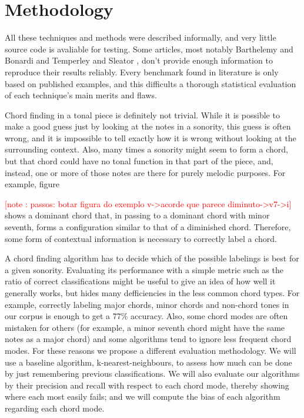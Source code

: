 \documentclass{article}
\newcounter{notecounter}
\newcommand{\note}[1]{
  \addtocounter{notecounter}{1}
  \textcolor{red}{[note \arabic{notecounter}: #1]}
}
\newcommand{\comment}[1]{}
\begin{document}
\section{Methodology}
\label{sec:methodology}

\comment{
  ==> um problema de information retrieval
  ==> precision, recall (e significado)
  ==> corais de bach
}

All these techniques and methods were described informally, and very
little source code is avaliable for testing. Some articles, most
notably Barthelemy and Bonardi \cite{barthelemy.ea:figured} and
Temperley and Sleator \cite{temperley.ea:modeling}, don't provide
enough information to reproduce their results reliably. Every
benchmark found in literature \cite{pardo.ea:automated,
  barthelemy.ea:figured, tsui:harmonic, taube:automatic,
  illescas.ea:harmonic} is only based on published examples, and this
difficults a thorough statistical evaluation of each technique's main
merits and flaws.

Chord finding in a tonal piece is definitely not trivial. While it is
possible to make a good guess just by looking at the notes in a
sonority, this guess is often wrong, and it is impossible to tell
exactly how it is wrong without looking at the surrounding
context. Also, many times a sonority might seem to form a chord, but
that chord could have no tonal function in that part of the piece,
and, instead, one or more of those notes are there for purely melodic
purposes. For example, figure \note{passos: botar figura do exemplo
  v->acorde que parece diminuto->v7->i} shows a dominant chord that,
in passing to a dominant chord with minor seventh, forms a
configuration similar to that of a diminished chord. Therefore, some
form of contextual information is necessary to correctly label a
chord.

A chord finding algorithm has to decide which of the possible
labelings is best for a given sonority. Evaluating its performance
with a simple metric such as the ratio of correct classifications
might be useful to give an idea of how well it generally works, but
hides many defficiencies in the less common chord types. For example,
correctly labeling major chords, minor chords and non-chord tones in
our corpus is enough to get a $77\%$ accuracy. Also, some chord modes
are often mistaken for others (for example, a minor seventh chord
might have the same notes as a major chord) and some algorithms tend
to ignore less frequent chord modes. For these reasons we propose a
different evaluation methodology. We will use a baseline algorithm,
k-nearest-neighbours, to assess how much can be done by just
remembering previous classifications. We will also evaluate our
algorithms by their precision and recall with respect to each chord
mode, thereby showing where each most easily fails; and we will
compute the bias of each algorithm regarding each chord mode.
\end{document}
